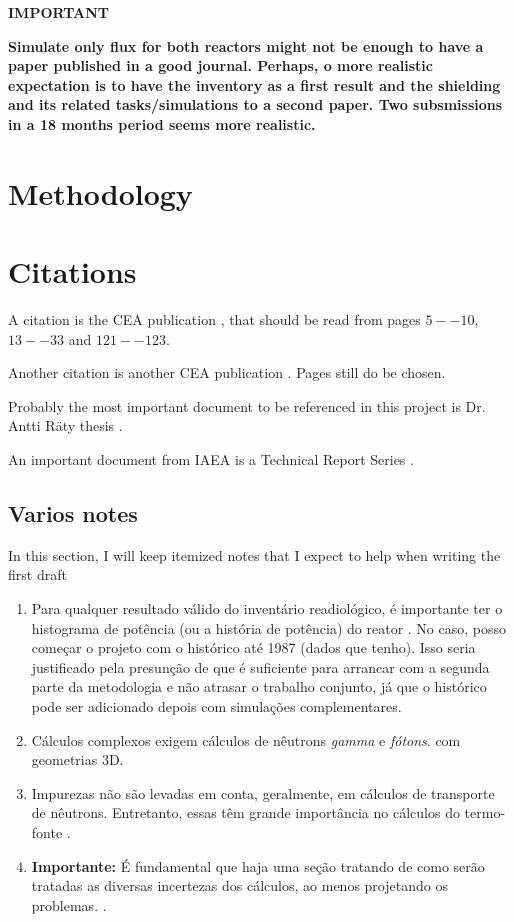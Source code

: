 \documentclass[11pt]{article} %
\begin{document}
\textbf{IMPORTANT}

\textbf{Simulate only flux for both reactors might not be enough to have a paper published in a good journal. Perhaps, o more realistic expectation is to have the inventory as a first result and the shielding and its related tasks/simulations to a second paper. Two subsmissions in a 18 months period seems more realistic.}

\section{Methodology}

\section{Citations}

A citation is the CEA publication \cite{Clean-up_CEA-e-DEN_2018}, that should be read from pages $5--10$, $13--33$ and $121--123$.

Another citation is another CEA publication \cite{Neutronics_CEA-e-DEN_2015}. Pages still do be chosen.

Probably the most important document to be referenced in this project is Dr. Antti R{\"a}ty thesis \cite{Raty_Thesis_2020}. 

An important document from IAEA is a Technical Report Series \cite{IAEA_TRS_494_2024}.

\subsection{Varios notes}

In this section, I will keep itemized notes that I expect to help when writing the first draft

\begin{enumerate}
\item Para qualquer resultado válido do inventário readiológico, é importante ter o histograma de potência (ou a história de potência) do reator \cite[p.~21]{Clean-up_CEA-e-DEN_2018}. No caso, posso começar o projeto com o histórico até 1987 (dados que tenho). Isso seria justificado pela presunção de que é suficiente para arrancar com a segunda parte da metodologia e não atrasar o trabalho conjunto, já que o histórico pode ser adicionado depois com simulações complementares.
\item Cálculos complexos exigem cálculos de nêutrons \textit{gamma} e \textit{fótons}.\cite[p.~22]{Clean-up_CEA-e-DEN_2018} com geometrias 3D.
\item Impurezas não são levadas em conta, geralmente, em cálculos de transporte de nêutrons. Entretanto, essas têm grande importância no cálculos do termo-fonte \cite[p.~24]{Clean-up_CEA-e-DEN_2018}.
  \item \textbf{Importante:} É fundamental que haja uma seção tratando de como serão tratadas as diversas incertezas dos cálculos, ao menos projetando os problemas. \cite[p.~165-170]{Neutronics_CEA-e-DEN_2015}.
\end{enumerate}


\end{document}
